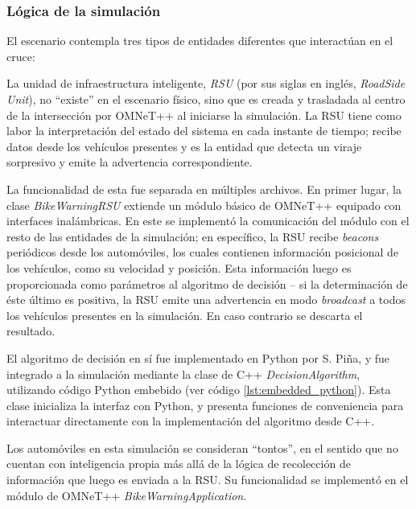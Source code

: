 \documentclass[11pt,letterpaper]{article}
\begin{document}
\subsubsection{Lógica de la simulación}

El escenario contempla tres tipos de entidades diferentes que interactúan en el cruce:

\begin{description}[leftmargin=!,labelwidth=\widthof{\bfseries Automóviles}]
	\item [RSU]	La unidad de infraestructura inteligente, \emph{RSU} (por sus siglas en inglés, \emph{RoadSide Unit}), no ``existe'' en el escenario físico, sino que es creada y trasladada al centro de la intersección por OMNeT++ al iniciarse la simulación. La RSU tiene como labor la interpretación del estado del sistema en cada instante de tiempo; recibe datos desde los vehículos presentes y es la entidad que detecta un viraje sorpresivo y emite la advertencia correspondiente.

	La funcionalidad de esta fue separada en múltiples archivos. En primer lugar, la clase \emph{BikeWarningRSU} extiende un módulo básico de OMNeT++ equipado con interfaces inalámbricas. En este se implementó la comunicación del módulo con el resto de las entidades de la simulación; en específico, la RSU recibe \emph{beacons} periódicos desde los automóviles, los cuales contienen información posicional de los vehículos, como su velocidad y posición. Esta información luego es proporcionada como parámetros al algoritmo de decisión -- si la determinación de éste último es positiva, la RSU emite una advertencia en modo \emph{broadcast} a todos los vehículos presentes en la simulación. En caso contrario se descarta el resultado.

	El algoritmo de decisión en sí fue implementado en Python por S. Piña, y fue integrado a la simulación mediante la clase de C++ \emph{DecisionAlgorithm}, utilizando código Python embebido (ver código \ref{lst:embedded_python}). Esta clase inicializa la interfaz con Python, y presenta funciones de conveniencia para interactuar directamente con la implementación del algoritmo desde C++.
	\item [Automóviles]	Los automóviles en esta simulación se consideran ``tontos'', en el sentido que no cuentan con inteligencia propia más allá de la lógica de recolección de información que luego es enviada a la RSU. Su funcionalidad se implementó en el módulo de OMNeT++ \emph{BikeWarningApplication}.


\end{description}
\end{document}
